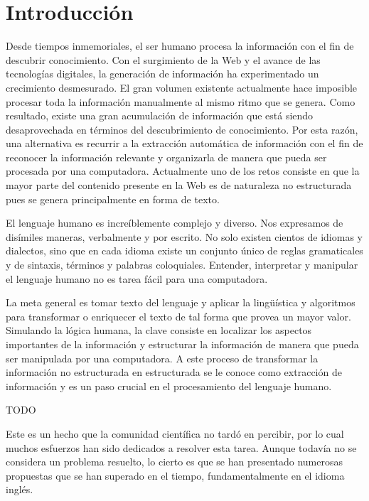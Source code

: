 \chapter*{Introducción}\label{chapter:introduction}

Desde tiempos inmemoriales, el ser humano procesa la información con el fin de descubrir conocimiento. Con el surgimiento de la Web y el avance de las tecnologías digitales, la generación de información ha experimentado un crecimiento desmesurado. El gran volumen existente actualmente hace imposible procesar toda la información manualmente al mismo ritmo que se genera. Como resultado, existe una gran acumulación de información que está siendo desaprovechada en términos del descubrimiento de  conocimiento. Por esta razón, una alternativa es recurrir a la extracción automática de información con el fin de reconocer la información relevante y organizarla de manera que pueda ser procesada por una computadora. Actualmente uno de los retos consiste en que la mayor parte del contenido presente en la Web es de naturaleza no estructurada pues se genera principalmente en forma de texto.

El lenguaje humano es increíblemente complejo y diverso. Nos expresamos de disímiles maneras, verbalmente y por escrito. No solo existen cientos de idiomas y dialectos, sino que en cada idioma existe un conjunto único de reglas gramaticales y de sintaxis, términos y palabras coloquiales. Entender, interpretar y manipular el lenguaje humano no es tarea fácil para una computadora.

La meta general es tomar texto del lenguaje y aplicar la lingüística y algoritmos para transformar o enriquecer el texto de tal forma que provea un mayor valor. Simulando la lógica humana, la clave consiste en localizar los aspectos importantes de la información y estructurar la información de manera que pueda ser manipulada por una computadora. A este proceso de transformar la información no estructurada en estructurada se le conoce como extracción de información y es un paso crucial en el procesamiento del lenguaje humano.

TODO

Este es un hecho que la comunidad científica no tardó en percibir, por lo cual muchos esfuerzos han sido dedicados a resolver esta tarea. Aunque todavía no se considera un problema resuelto, lo cierto es que se han presentado numerosas propuestas que se han superado en el tiempo, fundamentalmente en el idioma inglés. 



